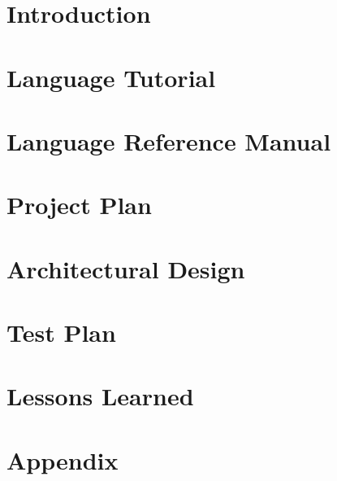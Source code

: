\documentclass[11pt]{article}
\begin{document}
\section{Introduction}

\newpage

\section{Language Tutorial}

\newpage

\section{Language Reference Manual}

\newpage

\section{Project Plan}

\newpage

\section{Architectural Design}

\newpage

\section{Test Plan}

\newpage

\section{Lessons Learned}

\newpage

\section{Appendix}
%
\newpage
\end{document}

